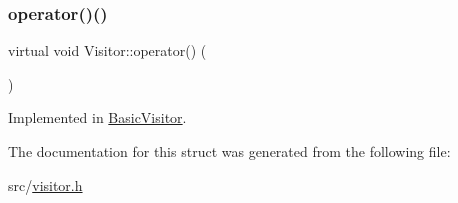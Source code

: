 \subsubsection{\texorpdfstring{operator()()}{operator()()}\hspace{0.1cm}{\footnotesize\ttfamily [59/59]}}
{\footnotesize\ttfamily virtual void Visitor\+::operator() (\begin{DoxyParamCaption}\item[{const \hyperlink{struct_program_declaration}{Program\+Declaration} \&}]{ }\end{DoxyParamCaption})\hspace{0.3cm}{\ttfamily [pure virtual]}}



Implemented in \hyperlink{struct_basic_visitor_a2ea35a5ede761a22479ba2be10ad0902}{Basic\+Visitor}.



The documentation for this struct was generated from the following file\+:\begin{DoxyCompactItemize}
\item 
src/\hyperlink{visitor_8h}{visitor.\+h}\end{DoxyCompactItemize}
